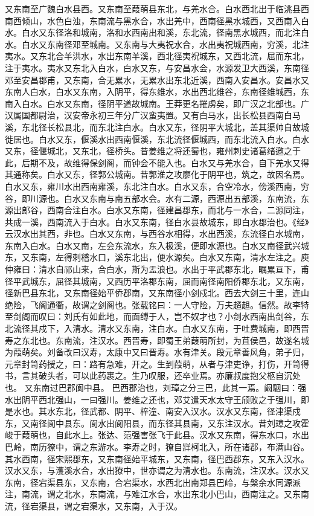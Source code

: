 \documentclass[12pt,UTF8]{ctexbook}
\begin{document}
又东南至广魏白水县西。又东南至葭萌县东北，与羌水合。白水西北出于临洮县西南西倾山，水色白浊，东南流与黑水合，水出羌中，西南径黑水城西，又西南入白水。白水又东径洛和城南，洛和水西南出和溪，东北流，径南黑水城西，而北注白水。白水又东南径邓至城南。又东南与大夷祝水合，水出夷祝城西南，穷溪，北注夷水。又东北合羊洪水，水出东南羊溪，西北径夷祝城东，又西北流，屈而东北，注于夷水。夷水又东北入白水，白水又东，与安昌水会，水源发卫大西溪，东南径邓至安昌郡甫，又东南，合无累水，无累水出东北近溪，西南入安昌水。安昌水又东南人白水，白水又东南，入阴平，得东维水，水出西北维谷，东南径维城西，东南入白水。白水又东南，径阴平道故城南。王莽更名摧虏矣，即广汉之北部也。广汉属国都尉治，汉安帝永初三年分广汉蛮夷置。又有白马水，出长松县西南白马溪，东北径长松县北，而东北注白水。白水又东，径阴平大城北，盖其渠帅自故城徙居也。白水又东，偃溪水出西南偃溪，东北流径偃城西，而东北流入白水。白水又东，径偃城北，又东北，径桥头。昔姜维之将还蜀也，雍州刺史诸葛绪邀之于此，后期不及，故维得保剑阁，而钟会不能入也。白水又与羌水合，自下羌水又得其通称矣。白水又东，径郭公城南。昔郭淮之攻廖化于阴平也，筑之，故因名焉。白水又东，雍川水出西南雍溪，东北注白水。白水又东，合空冷水，傍溪西南，穷谷，即川源也。白水又东南与南五部水会。水有二源，西源出五部溪，东南流，东源出郎谷，西南合注白水。白水又东南，径建昌郡东，而北与一水合，二源同注，共成一溪，西南流入于白水。白水又东南，径白水县故城东，即白水郡治也。《经》云汉水出其西，非也。白水又东南，与西谷水相得，水出西溪，东流径白水城南，东南入白水。白水又南，左会东流水，东入极溪，便即水源也。白水又南径武兴城东，又东南，左得刺稽水口，溪东北出，便水源矣。白水又东南，清水左注之。庾仲雍曰：清水自祁山来，合白水，斯为盂浪也。水出于平武郡东北，瞩累亘下，甫径平武城东，屈径其城南，又西历平洛郡东南，屈而南径南阳侨郡东北，又东南，径新巴县东北，又东南径始平侨郡南，又东南径小剑戍北。西去大剑三十里，连山绝险，飞阁通衢，故谓之剑阁也。张载铭曰：一人守险，万夫趦趄。信然。故李特至剑阁而叹曰：刘氏有如此地，而面缚于人，岂不奴才也？小剑水西南出剑谷，东北流径其戍下，入清水。清水又东南，注白水。白水又东南，于吐费城南，即西晋寿之东北也。东南流，注汉水。西晋寿，即蜀王弟葭萌所封，为苴侯邑，故遂名城为葭萌矣。刘备改曰汉寿，太康中又曰晋寿。水有津关。段元章善风角，弟子归，元章封笥药授之，曰：路有急难，开之。生到葭萌，从者与津吏诤，打伤，开笥得书，言其破头者，可以此药裹之。生乃叹服，还卒业焉。亦廉叔度抱父柩自沉处也。
又东南过巴郡阆中县。
巴西郡治也，刘璋之分三巴，此其一焉。阚駰曰：强水出阴平西北强山，一曰强川。姜维之还也，邓艾遣天水太守王颀败之于强川，即是水也。其水东北，径武都、阴平、梓潼、南安入汉水。汉水又东南，径津渠戍东，又南径阆中县东。阆水出阆阳县，而东径其县南，又东注汉水。昔刘璋之攻霍峻于葭萌也，自此水上。张达、范强害张飞于此县。汉水又东南，得东水口，水出巴岭，南历獠中，谓之东游水。李寿之时，獠自牂柯北入，所在诸郡，布满山谷。其水西南，径宋熙郡东，又东南径始平城东，又东南，径巴西郡东，又东入汉水。汉水又东，与濩溪水合，水出獠中，世亦谓之为清水也。东南流，注汉水。汉水又东南，径宕渠县东，又东南，合宕渠水，水西北出南郑县巴岭，与槃余水同源派注，南流，谓之北水，东南流，与难江水合，水出东北小巴山，西南注之。又东南流，径宕渠县，谓之宕渠水，又东南，入于汉。
\end{document}
